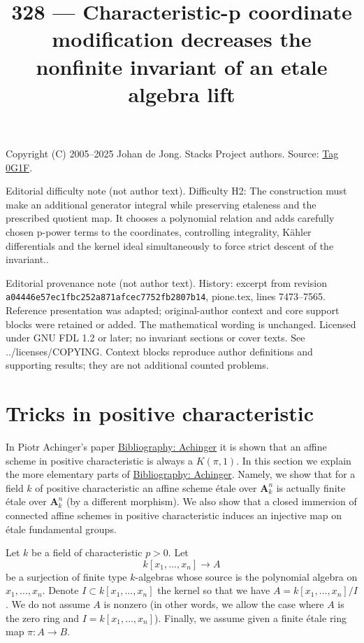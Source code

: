 \documentclass{amsart}
\theoremstyle{plain}
\theoremstyle{definition}
\theoremstyle{remark}
\numberwithin{equation}{subsection}
\begin{document}
\title[Stacks Project, Tag 0G1F]{328 --- Characteristic-p coordinate modification decreases the nonfinite invariant of an etale algebra lift}
\maketitle
\noindent Copyright (C) 2005--2025 Johan de Jong. Stacks Project authors. Source: \href{https://stacks.math.columbia.edu/tag/0G1F}{Tag 0G1F}.

\noindent Editorial difficulty note (not author text). Difficulty H2: The construction must make an additional generator integral while preserving etaleness and the prescribed quotient map. It chooses a polynomial relation and adds carefully chosen p-power terms to the coordinates, controlling integrality, Kähler differentials and the kernel ideal simultaneously to force strict descent of the invariant..

\noindent Editorial provenance note (not author text). History: excerpt from revision \texttt{a0444\allowbreak 6e57e\allowbreak c1fbc\allowbreak 252a8\allowbreak 71afc\allowbreak ec775\allowbreak 2fb28\allowbreak 07b14}, pione.tex, lines 7473--7565. Reference presentation was adapted; original-author context and core support blocks were retained or added. The mathematical wording is unchanged. Licensed under GNU FDL 1.2 or later; no invariant sections or cover texts. See ../licenses/COPYING. Context blocks reproduce author definitions and supporting results; they are not additional counted problems.

\section{Tricks in positive characteristic}
\label{section-achinger}

\noindent
In Piotr Achinger's paper \href{https://stacks.math.columbia.edu/bibliography}{Bibliography: Achinger} it is shown that an
affine scheme in positive characteristic is always a $K(\pi, 1)$.
In this section we explain the more elementary parts of \href{https://stacks.math.columbia.edu/bibliography}{Bibliography: Achinger}.
Namely, we show that for a field $k$ of positive characteristic
an affine scheme \'etale over $\mathbf{A}^n_k$ is actually finite \'etale
over $\mathbf{A}^n_k$ (by a different morphism). We also show
that a closed immersion of connected affine schemes
in positive characteristic induces an injective map on
\'etale fundamental groups.

\medskip\noindent
Let $k$ be a field of characteristic $p > 0$.
Let
$$
k[x_1, \ldots, x_n] \longrightarrow A
$$
be a surjection of finite type $k$-algebras whose source is the
polynomial algebra on $x_1, \ldots, x_n$. Denote
$I \subset k[x_1, \ldots, x_n]$ the kernel so that we have
$A = k[x_1, \ldots, x_n]/I$. We do not assume $A$ is nonzero
(in other words, we allow the case where $A$ is the zero ring
and $I = k[x_1, \ldots, x_n]$). Finally, we assume given a
finite \'etale ring map $\pi : A \to B$.
\end{document}
